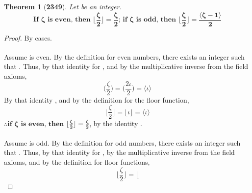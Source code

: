 \documentclass[preview]{standalone}
\newtheorem*{theorem*}{Theorem}
\begin{document}
\begin{theorem*}[\textbf{2349}]
    Let \bm{$\zeta$} be an integer. 
    \begin{equation*}
        \textbf{If } \bm{\zeta} \textbf{ is even, then } 
        \bm{
            \bigg \lfloor \frac{\zeta}{2} \bigg \rfloor
                = 
            \frac{\zeta}{2}
        }
        \textbf{; if } \bm{\zeta} \textbf{ is odd, then } 
        \bm{
            \bigg \lfloor \frac{\zeta}{2} \bigg \rfloor 
                = 
            \frac{ \big \langle \zeta - 1 \big \rangle }{2}
        }
    \end{equation*}
\end{theorem*}

\begin{proof}
    By cases. 
    \\ \\
     Assume \bm{$\zeta$} is even.
    By the definition for even numbers,
    there exists an integer \bm{$\iota$} such that 
    \bm{$\zeta = 2 \iota$}. 
    Thus, by that identity for \bm{$\zeta$}, 
    and by the multiplicative inverse from the field axioms,
    \begin{equation*}
        \bigg( \frac{\zeta}{2} \bigg)
            = 
        \bigg( \frac{2 \iota}{2} \bigg)
            = 
        \Big \langle \iota \Big \rangle
    \end{equation*}
    By that identity \bm{$\iota$}, 
    and by the definition for the floor function,
    \begin{equation*}
        \Big \lfloor \frac{\zeta}{2} \Big \rfloor
            =
        \Big \lfloor \iota \Big \rfloor 
            = 
        \Big \langle \iota \Big \rangle
    \end{equation*}
    $\therefore \textbf{if } \bm{\zeta} \textbf{ is even, then } 
        \bm{
            \Big \lfloor \frac{\zeta}{2} \Big \rfloor
                = 
            \frac{\zeta}{2}
    }$, 
    by the identity \bm{$\iota$}.
    \\ \\
     Assume \bm{$\zeta$} is odd. 
    By the definition for odd numbers,
    there exists an integer \bm{$\iota$} such that 
    .
    Thus, by that identity for \bm{$\zeta$}, 
    by the multiplicative inverse from the field axioms,
    and by the definition for floor functions,
    \begin{equation*}
        \bigg \lfloor 
            \frac{\zeta}{2}
        \bigg \rfloor 
            = 
        \bigg \lfloor 

\end{equation*}
\end{proof}
\end{document}
